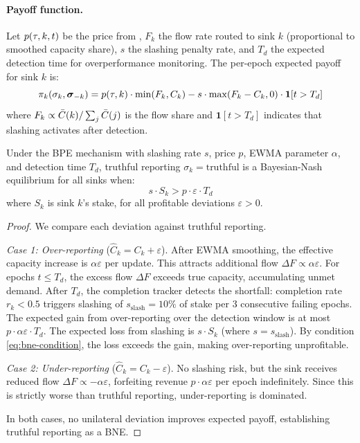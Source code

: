 \paragraph{Payoff function.}
Let $p(\tau, k, t)$ be the price from , $F_k$ the flow rate
routed to sink $k$ (proportional to smoothed capacity share), $s$ the slashing
penalty rate, and $T_d$ the expected detection time for overperformance monitoring.
The per-epoch expected payoff for sink $k$ is:
\begin{equation}
\label{eq:payoff}
\pi_k(\sigma_k, \boldsymbol{\sigma}_{-k}) =
    p(\tau, k) \cdot \min(F_k, C_k) - s \cdot \max(F_k - C_k, 0) \cdot \mathbf{1}[t > T_d]
\end{equation}
where $F_k \propto \bar{C}(k) / \sum_j \bar{C}(j)$ is the flow share and
$\mathbf{1}[t > T_d]$ indicates that slashing activates after detection.

\begin{proposition}
\label{prop:bne}
Under the BPE mechanism with slashing rate $s$, price $p$, EWMA parameter
$\alpha$, and detection time $T_d$, truthful reporting $\sigma_k = \text{truthful}$
is a Bayesian-Nash equilibrium for all sinks when:
\begin{equation}
\label{eq:bne-condition}
s \cdot S_k > p \cdot \varepsilon \cdot T_d
\end{equation}
where $S_k$ is sink $k$'s stake, for all profitable deviations $\varepsilon > 0$.
\end{proposition}

\begin{proof}
We compare each deviation against truthful reporting.

\emph{Case 1: Over-reporting} ($\hat{C}_k = C_k + \varepsilon$).
After EWMA smoothing, the effective capacity increase is $\alpha \varepsilon$
per update. This attracts additional flow $\Delta F \propto \alpha \varepsilon$.
For epochs $t \leq T_d$, the excess flow $\Delta F$ exceeds true capacity,
accumulating unmet demand. After $T_d$, the completion tracker detects the
shortfall: completion rate $r_k < 0.5$ triggers slashing of
$s_{\text{slash}} = 10\%$ of stake per 3 consecutive failing epochs.
The expected gain from over-reporting over the detection window is at most
$p \cdot \alpha \varepsilon \cdot T_d$. The expected loss from slashing is
$s \cdot S_k$ (where $s = s_{\text{slash}}$). By condition \eqref{eq:bne-condition},
the loss exceeds the gain, making over-reporting unprofitable.

\emph{Case 2: Under-reporting} ($\hat{C}_k = C_k - \varepsilon$).
No slashing risk, but the sink receives reduced flow
$\Delta F \propto -\alpha \varepsilon$, forfeiting revenue
$p \cdot \alpha \varepsilon$ per epoch indefinitely. Since this is strictly
worse than truthful reporting, under-reporting is dominated.

In both cases, no unilateral deviation improves expected payoff, establishing
truthful reporting as a BNE.
\end{proof}

